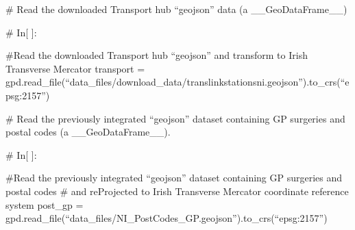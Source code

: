 \documentclass[letterpaper,10pt,english]{sphinxmanual}
\begin{document}
\sphinxAtStartPar
\# Read the downloaded Transport hub “geojson” data (a \_\_GeoDataFrame\_\_)

\sphinxAtStartPar
\# In{[} {]}:

\sphinxAtStartPar
\#Read the downloaded Transport hub “geojson” and transform to Irish Transverse Mercator
transport = gpd.read\_file(“data\_files/download\_data/translink\sphinxhyphen{}stations\sphinxhyphen{}ni.geojson”).to\_crs(“epsg:2157”)

\sphinxAtStartPar
\# Read the previously integrated “geojson” dataset containing GP surgeries and postal codes (a \_\_GeoDataFrame\_\_).

\sphinxAtStartPar
\# In{[} {]}:

\sphinxAtStartPar
\#Read the previously integrated “geojson” dataset containing GP surgeries and postal codes
\# and re\sphinxhyphen{}Projected to Irish Transverse Mercator coordinate reference system
post\_gp = gpd.read\_file(“data\_files/NI\_PostCodes\_GP.geojson”).to\_crs(“epsg:2157”)
\end{document}
